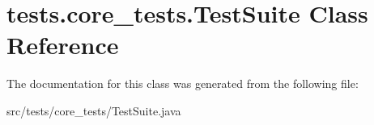 \hypertarget{classtests_1_1core__tests_1_1_test_suite}{\section{tests.\-core\-\_\-tests.\-Test\-Suite Class Reference}
\label{classtests_1_1core__tests_1_1_test_suite}
}


The documentation for this class was generated from the following file\-:\begin{DoxyCompactItemize}
\item 
src/tests/core\-\_\-tests/Test\-Suite.\-java\end{DoxyCompactItemize}
